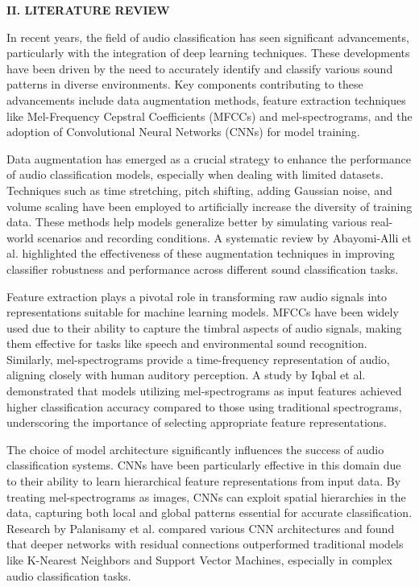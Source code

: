\documentclass[12pt]{article}
\begin{document}
\begin{center}
{\fontsize{9}{11}\selectfont\bfseries II. LITERATURE REVIEW}
\end{center}

\vspace{0.2em}

{\fontsize{9}{11}\selectfont
\indent In recent years, the field of audio classification has seen significant advancements, particularly with the integration of deep learning techniques. These developments have been driven by the need to accurately identify and classify various sound patterns in diverse environments. Key components contributing to these advancements include data augmentation methods, feature extraction techniques like Mel-Frequency Cepstral Coefficients (MFCCs) and mel-spectrograms, and the adoption of Convolutional Neural Networks (CNNs) for model training.

Data augmentation has emerged as a crucial strategy to enhance the performance of audio classification models, especially when dealing with limited datasets. Techniques such as time stretching, pitch shifting, adding Gaussian noise, and volume scaling have been employed to artificially increase the diversity of training data. These methods help models generalize better by simulating various real-world scenarios and recording conditions. A systematic review by Abayomi-Alli et al.\cite{abayomi2023augmentation} highlighted the effectiveness of these augmentation techniques in improving classifier robustness and performance across different sound classification tasks.

Feature extraction plays a pivotal role in transforming raw audio signals into representations suitable for machine learning models. MFCCs have been widely used due to their ability to capture the timbral aspects of audio signals, making them effective for tasks like speech and environmental sound recognition. Similarly, mel-spectrograms provide a time-frequency representation of audio, aligning closely with human auditory perception. A study by Iqbal et al.\cite{iqbal2021mel} demonstrated that models utilizing mel-spectrograms as input features achieved higher classification accuracy compared to those using traditional spectrograms, underscoring the importance of selecting appropriate feature representations.

The choice of model architecture significantly influences the success of audio classification systems. CNNs have been particularly effective in this domain due to their ability to learn hierarchical feature representations from input data. By treating mel-spectrograms as images, CNNs can exploit spatial hierarchies in the data, capturing both local and global patterns essential for accurate classification. Research by Palanisamy et al.\cite{palanisamy2024cnn} compared various CNN architectures and found that deeper networks with residual connections outperformed traditional models like K-Nearest Neighbors and Support Vector Machines, especially in complex audio classification tasks.

}
\end{document}
